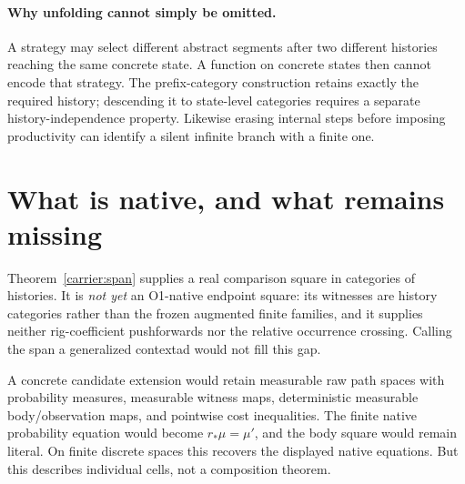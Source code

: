 \documentclass[11pt]{article}
\begin{document}
\paragraph{Why unfolding cannot simply be omitted.} A strategy may select different abstract segments after two different histories reaching the same concrete state. A function on concrete states then cannot encode that strategy. The prefix-category construction retains exactly the required history; descending it to state-level categories requires a separate history-independence property. Likewise erasing internal steps before imposing productivity can identify a silent infinite branch with a finite one.

\section{What is native, and what remains missing}
Theorem~\ref{carrier:span} supplies a real comparison square in categories of histories. It is \emph{not yet} an O1-native endpoint square: its witnesses are history categories rather than the frozen augmented finite families, and it supplies neither rig-coefficient pushforwards nor the relative occurrence crossing. Calling the span a generalized contextad would not fill this gap.

A concrete candidate extension would retain measurable raw path spaces with probability measures, measurable witness maps, deterministic measurable body/observation maps, and pointwise cost inequalities. The finite native probability equation would become $r_*\mu=\mu'$, and the body square would remain literal. On finite discrete spaces this recovers the displayed native equations. But this describes individual cells, not a composition theorem.
\end{document}
